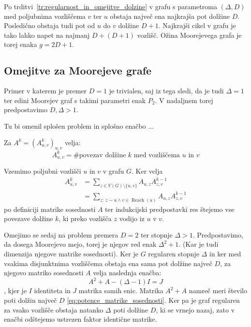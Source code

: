 \documentclass[fin1, tisk]{fmfdelo}
\newcommand{\reach}{\operatorname{Reach}}
\begin{document}
\begin{posledica}\label{po:ozina}
Po trditvi~\ref{tr:regularnost_in_omejitve_dolzine} v grafu s parametroma $(\Delta, D)$ 
med poljubnima vozliščema
$v$ ter $u$ obstaja največ ena najkrajša pot dolžine $D$. Posledično 
obstaja tudi pot od $u$ do $v$ dolžine $D + 1$. Najkrajši cikel 
v grafu je tako lahko napet na najmanj $D + (D + 1)$ vozlišč.
Ožina Moorejevega grafa je torej enaka $g=2D + 1$.

\end{posledica}


\subsection{Omejitve za Moorejeve grafe}

Primer v katerem je premer $D = 1$ je trivialen, saj iz tega sledi,
da je tudi $\Delta = 1$ ter edini Moorejev graf s takimi parametri enak 
$P_2$. V nadaljnem torej predpostavimo $D, \Delta > 1$.

Tu bi omenil splošen problem in splošno enačbo ... 

\begin{trditev}
Za $A^k = (A^k_{u, v})_{u, v}$ velja:
\begin{equation}
A^k_{u, v} = \# \text{povezav dolžine $k$ med vozliščema $u$ in $v$}
\label{eq:potence_matrike_sosednosti}
\end{equation}
\end{trditev}

\begin{dokaz}
Vzemimo poljubni vozlišči $u$ in $v$ v grafu $G$. Ker velja 
\begin{align}
A^k_{u, v} &= \sum_{z \in V(G) \setminus \{u, v\}} A_{u, z} A^{k - 1}_{z, v} \\
           &= \sum_{z:~ z \sim u \land v \in \reach(u)} A_{u, z} A^{k - 1}_{z, v}
\end{align}
po definiciji matrike sosednosti $A$ ter indukcijski predpostavki res 
štejemo vse povezave dolžine $k$, ki preko vozlišča $z$ vodijo iz $u$ v $v$.
\end{dokaz}

Omejimo se sedaj na problem premera $D=2$ ter stopnje $\Delta > 1$. Predpostavimo,
da dosega Moorejevo mejo, torej je njegov red enak $\Delta^2 + 1$.
(Kar je tudi dimenzija njegove matrike sosednosti).
Ker je $G$ regularen stopnje $\Delta$ in ker med vsakima disjunktnima 
vozliščema obstaja ena sama pot dolžine največ $D$, za njegovo matriko sosednosti 
$A$ velja naslednja enačba: 
\begin{equation}
A^2 + A - (\Delta - 1) I = J
\end{equation}
, kjer je $I$ identiteta in $J$ matrika samih enic.
Matrika $A^2 + A$ namreč meri število poti dolžin največ $D$
\eqref{eq:potence_matrike_sosednosti}. Ker pa je graf 
regularen za vsako vozlišče obstaja natanko $\Delta$ poti dolžine $D$, ki se 
vrnejo nazaj, zato v enačbi odštejemo ustrezen faktor identične matrike.
\end{document}
